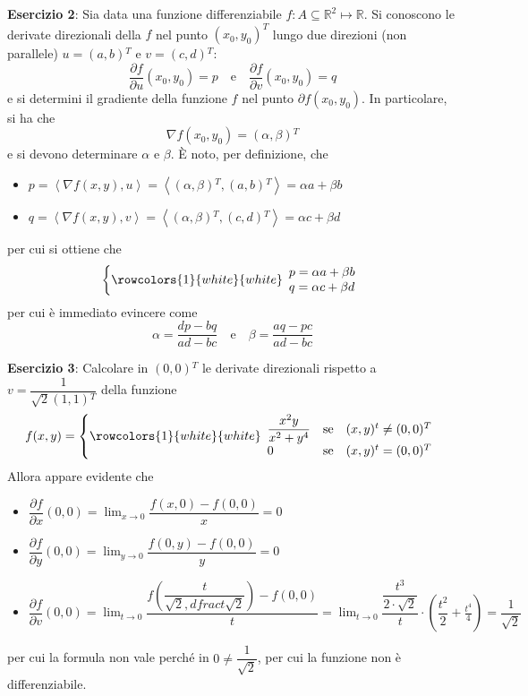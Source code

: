 \documentclass[a4paper]{extarticle}
\begin{document}
\vspace{2em}
\noindent
\textbf{Esercizio 2}: Sia data una funzione differenziabile $f : A \subseteq \mathbb{R}^2 \longmapsto \mathbb{R}$. Si conoscono le derivate direzionali della $f$ nel punto $(x_0,y_0)^T$ lungo due direzioni (non parallele) $u=(a,b){^T}$ e $v=(c,d){^T}$:
\[\frac{\partial f}{\partial u} (x_0,y_0)=p \hspace{1em} \text{e} \hspace{1em} \frac{\partial f}{\partial v} (x_0,y_0)=q\]
e si determini il gradiente della funzione $f$ nel punto $\partial f(x_0,y_0)$. In particolare, si ha che
\[\nabla f(x_0,y_0) = (\alpha, \beta){^T}\]
e si devono determinare $\alpha$ e $\beta$. È noto, per definizione, che
\begin{itemize}
    \item $p=\left<\nabla f(x,y), u\right>= \left<(\alpha,\beta){^T}, (a,b){^T}\right> = \alpha a + \beta b$
    \item $q=\left<\nabla f(x,y), v\right>= \left<(\alpha,\beta){^T}, (c,d){^T}\right> = \alpha c + \beta d$
\end{itemize}
per cui si ottiene che
\[
    \left\{
        \rowcolors{1}{white}{white}    
        \begin{array}{l}
            p=\alpha a + \beta b\\
            q=\alpha c + \beta d
        \end{array}
    \right.
\]
per cui è immediato evincere come
\[\alpha=\frac{dp-bq}{ad-bc} \hspace{1em} \text{e} \hspace{1em} \beta=\frac{aq-pc}{ad-bc}\]

\vspace{2em}
\noindent
\textbf{Esercizio 3}: Calcolare in $(0,0){^T}$ le derivate direzionali rispetto a $v=\dfrac{1}{\sqrt{2} (1,1){^T}}$ della funzione
\[
    f(x,y) =
    \left\{
        \rowcolors{1}{white}{white}    
        \begin{array}{lll}
            \dfrac{x^2y}{x^2+y^4} & \text{se} & (x,y){^t} \neq (0,0){^T}\\
            0 & \text{se} & (x,y){^t} = (0,0){^T}\\
        \end{array}
    \right.
\]
Allora appare evidente che
\begin{itemize}
    \item $\dfrac{\partial f}{\partial x}(0,0) = \lim_{x \to 0} \dfrac{f(x,0) - f(0,0)}{x} = 0$
    \item $\dfrac{\partial f}{\partial y}(0,0) = \lim_{y \to 0} \dfrac{f(0,y) - f(0,0)}{y} = 0$
    \item $\dfrac{\partial f}{\partial v}(0,0) = \lim_{t \to 0} \dfrac{f \left(\dfrac{t}{\sqrt{2},dfrac{t}{\sqrt{2}}}\right) - f(0,0)}{t} = \lim_{t \to 0} \dfrac{\dfrac{t^3}{2 \cdot \sqrt{2}}}{t} \cdot \left(\dfrac{t^2}{2}+\frac{t^4}{4}\right) = \dfrac{1}{\sqrt{2}}$
\end{itemize}
per cui la formula non vale perché in $0 \neq \dfrac{1}{\sqrt{2}}$, per cui la funzione non è differenziabile.
\end{document}
